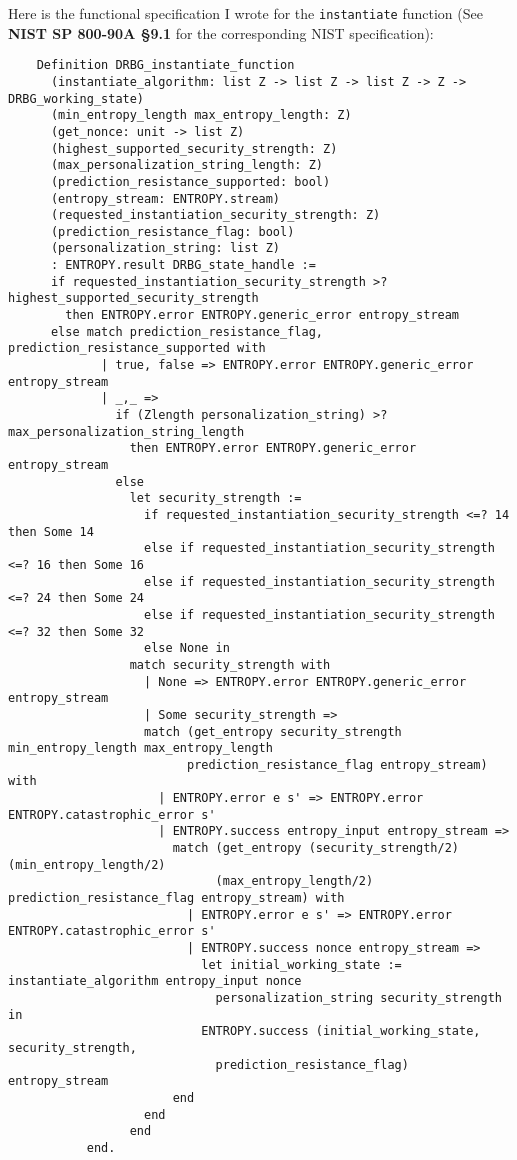 \documentclass[pageno]{jpaper}
\newcommand{\stdtitle}[1]{\textbf{#1}}
\begin{document}
Here is the functional specification I wrote for the \lstinline{instantiate} function (See \stdtitle{NIST SP 800-90A \S 9.1} for the corresponding NIST specification):

\begin{lstlisting}
    Definition DRBG_instantiate_function
      (instantiate_algorithm: list Z -> list Z -> list Z -> Z -> DRBG_working_state)
      (min_entropy_length max_entropy_length: Z)
      (get_nonce: unit -> list Z)
      (highest_supported_security_strength: Z)
      (max_personalization_string_length: Z)
      (prediction_resistance_supported: bool)
      (entropy_stream: ENTROPY.stream)
      (requested_instantiation_security_strength: Z)
      (prediction_resistance_flag: bool)
      (personalization_string: list Z)
      : ENTROPY.result DRBG_state_handle :=
      if requested_instantiation_security_strength >? highest_supported_security_strength
        then ENTROPY.error ENTROPY.generic_error entropy_stream
      else match prediction_resistance_flag, prediction_resistance_supported with
             | true, false => ENTROPY.error ENTROPY.generic_error entropy_stream
             | _,_ =>
               if (Zlength personalization_string) >? max_personalization_string_length
                 then ENTROPY.error ENTROPY.generic_error entropy_stream
               else
                 let security_strength :=
                   if requested_instantiation_security_strength <=? 14 then Some 14
                   else if requested_instantiation_security_strength <=? 16 then Some 16
                   else if requested_instantiation_security_strength <=? 24 then Some 24
                   else if requested_instantiation_security_strength <=? 32 then Some 32
                   else None in
                 match security_strength with
                   | None => ENTROPY.error ENTROPY.generic_error entropy_stream
                   | Some security_strength =>
                   match (get_entropy security_strength min_entropy_length max_entropy_length
                         prediction_resistance_flag entropy_stream) with
                     | ENTROPY.error e s' => ENTROPY.error ENTROPY.catastrophic_error s'
                     | ENTROPY.success entropy_input entropy_stream =>
                       match (get_entropy (security_strength/2) (min_entropy_length/2)
                             (max_entropy_length/2) prediction_resistance_flag entropy_stream) with
                         | ENTROPY.error e s' => ENTROPY.error ENTROPY.catastrophic_error s'
                         | ENTROPY.success nonce entropy_stream =>
                           let initial_working_state := instantiate_algorithm entropy_input nonce
                             personalization_string security_strength in
                           ENTROPY.success (initial_working_state, security_strength,
                             prediction_resistance_flag) entropy_stream
                       end
                   end
                 end
           end.
\end{lstlisting}
\end{document}
